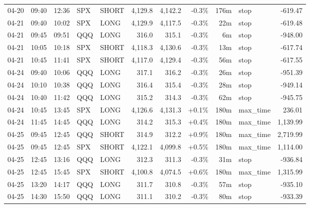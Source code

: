\documentclass[11pt,a4paper,twoside]{article}
\begin{document}
\begin{center}
\begin{longtable}{>{\color{txtmain}}l l l l l r r r r >{\color{txtmain}}l r}
04-20 & 09:40 & 12:36 & SPX & SHORT & 4,129.8 & 4,142.2 & \textcolor{lossred}{-0.3\%} & 176m & stop & \textcolor{lossred}{-619.47} \\
04-21 & 09:40 & 10:02 & SPX & LONG & 4,129.9 & 4,117.5 & \textcolor{lossred}{-0.3\%} & 22m & stop & \textcolor{lossred}{-619.48} \\
04-21 & 09:45 & 09:51 & QQQ & LONG & 316.0 & 315.1 & \textcolor{lossred}{-0.3\%} & 6m & stop & \textcolor{lossred}{-948.00} \\
04-21 & 10:05 & 10:18 & SPX & SHORT & 4,118.3 & 4,130.6 & \textcolor{lossred}{-0.3\%} & 13m & stop & \textcolor{lossred}{-617.74} \\
04-21 & 10:45 & 11:41 & SPX & SHORT & 4,117.0 & 4,129.4 & \textcolor{lossred}{-0.3\%} & 56m & stop & \textcolor{lossred}{-617.55} \\
04-24 & 09:40 & 10:06 & QQQ & LONG & 317.1 & 316.2 & \textcolor{lossred}{-0.3\%} & 26m & stop & \textcolor{lossred}{-951.39} \\
04-24 & 10:10 & 10:38 & QQQ & LONG & 316.4 & 315.4 & \textcolor{lossred}{-0.3\%} & 28m & stop & \textcolor{lossred}{-949.14} \\
04-24 & 10:40 & 11:42 & QQQ & LONG & 315.2 & 314.3 & \textcolor{lossred}{-0.3\%} & 62m & stop & \textcolor{lossred}{-945.75} \\
04-24 & 10:45 & 13:45 & SPX & LONG & 4,126.6 & 4,131.3 & \textcolor{wingreen}{+0.1\%} & 180m & max\_time & \textcolor{wingreen}{236.01} \\
04-24 & 11:45 & 14:45 & QQQ & LONG & 314.2 & 315.3 & \textcolor{wingreen}{+0.4\%} & 180m & max\_time & \textcolor{wingreen}{1,139.99} \\
04-25 & 09:45 & 12:45 & QQQ & SHORT & 314.9 & 312.2 & \textcolor{wingreen}{+0.9\%} & 180m & max\_time & \textcolor{wingreen}{2,719.99} \\
04-25 & 09:45 & 12:45 & SPX & SHORT & 4,122.1 & 4,099.8 & \textcolor{wingreen}{+0.5\%} & 180m & max\_time & \textcolor{wingreen}{1,114.00} \\
04-25 & 12:45 & 13:16 & QQQ & LONG & 312.3 & 311.3 & \textcolor{lossred}{-0.3\%} & 31m & stop & \textcolor{lossred}{-936.84} \\
04-25 & 12:45 & 15:45 & SPX & SHORT & 4,100.8 & 4,074.5 & \textcolor{wingreen}{+0.6\%} & 180m & max\_time & \textcolor{wingreen}{1,315.99} \\
04-25 & 13:20 & 14:17 & QQQ & LONG & 311.7 & 310.8 & \textcolor{lossred}{-0.3\%} & 57m & stop & \textcolor{lossred}{-935.10} \\
04-25 & 14:30 & 15:50 & QQQ & LONG & 311.1 & 310.2 & \textcolor{lossred}{-0.3\%} & 80m & stop & \textcolor{lossred}{-933.39} \\

\end{longtable}
\end{center}
\end{document}

